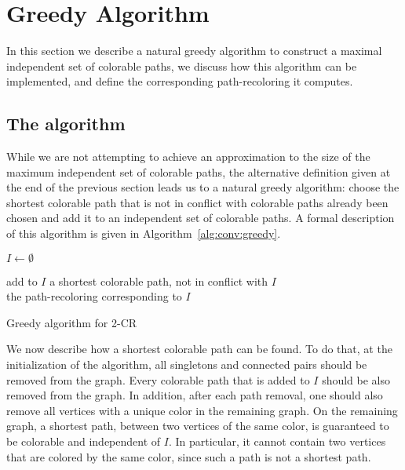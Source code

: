 
\section{Greedy Algorithm}
\label{sec:greedy}

In this section we describe a natural greedy algorithm to construct a maximal
independent set of colorable paths, 
we discuss how this algorithm can be implemented,
and define the corresponding path-recoloring it computes.


\subsection{The algorithm}
%
While we are not attempting to achieve an approximation to the size
of the maximum independent set of colorable paths,
the alternative definition given at the end of the previous section
leads us to a natural greedy algorithm: 
choose the shortest colorable path that 
is not in conflict with colorable paths already been chosen and add it
to an independent set of colorable paths.
%
A formal description of this algorithm is given in
Algorithm~\ref{alg:conv:greedy}.

\begin{algorithm}
\begin{algorithmic}

\State $I \gets \emptyset$

\State add to $I$ a shortest colorable path, not in conflict with $I$ 
\EndWhile
\\
\Return the path-recoloring corresponding to $I$


\end{algorithmic}
\caption{Greedy algorithm for 2-CR}
\label{alg:conv:greedy}
\end{algorithm}

We now describe how a shortest colorable path can be found.
%
To do that, 
at the initialization of the algorithm, 
all singletons and connected pairs should be removed from the graph.  
%
Every colorable path that is added to $I$ should be also removed from the graph.  
%
In addition, 
after each path removal, 
one should also remove all vertices with a unique color in the remaining graph.  
%
On the remaining graph, 
a shortest path, 
between two vertices of the same color, 
is guaranteed to be colorable and independent of $I$.
%
In particular,
it cannot contain two vertices that are colored by the same color, 
since such a path is not a shortest path.
